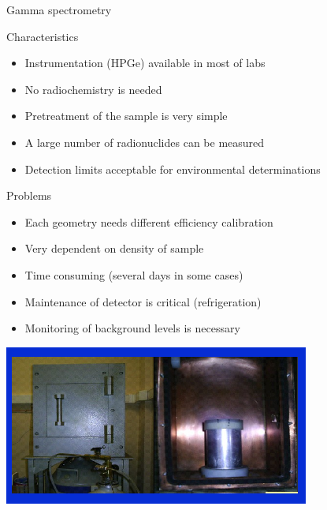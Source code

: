 \begin{frame}[allowframebreaks]{Gamma spectrometry}

\begin{exampleblock}{Characteristics}

\begin{itemize}
	\item Instrumentation (HPGe) available in most of labs 
 \item No radiochemistry is needed
\item  Pretreatment of the sample is very simple
 \item A large number of radionuclides can be measured
 \item Detection limits acceptable for environmental determinations
\end{itemize}

\end{exampleblock}

\begin{alertblock}{Problems}

\begin{itemize}
	\item Each geometry needs different efficiency calibration
 \item Very dependent on density of sample
 \item Time consuming (several days in some cases)
 \item Maintenance of detector is critical (refrigeration)
 \item Monitoring of background levels is necessary
\end{itemize}

\end{alertblock}

%

\centering
\includegraphics[scale=0.7]{figures/hpgelaruc.png}

\end{frame}

